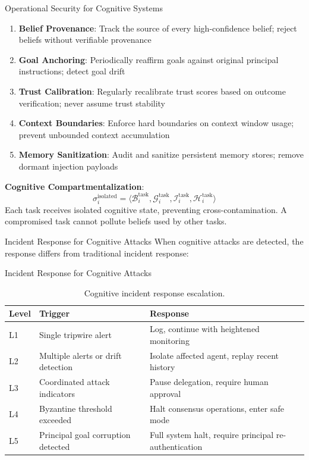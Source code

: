 \documentclass[
  ignorenonframetext,
]{beamer}
\begin{document}
\begin{frame}[allowframebreaks]{Operational Security for Cognitive
Systems}
\begin{enumerate}
\item \textbf{Belief Provenance}: Track the source of every high-confidence belief; reject beliefs without verifiable provenance
\item \textbf{Goal Anchoring}: Periodically reaffirm goals against original principal instructions; detect goal drift
\item \textbf{Trust Calibration}: Regularly recalibrate trust scores based on outcome verification; never assume trust stability
\item \textbf{Context Boundaries}: Enforce hard boundaries on context window usage; prevent unbounded context accumulation
\item \textbf{Memory Sanitization}: Audit and sanitize persistent memory stores; remove dormant injection payloads
\end{enumerate}

\textbf{Cognitive Compartmentalization}: \begin{equation}
\label{eq:compartmentalization}
\sigma_i^{\text{isolated}} = \langle \mathcal{B}_i^{\text{task}}, \mathcal{G}_i^{\text{task}}, \mathcal{I}_i^{\text{task}}, \mathcal{H}_i^{\text{task}} \rangle
\end{equation} Each task receives isolated cognitive state, preventing
cross-contamination. A compromised task cannot pollute beliefs used by
other tasks.
\end{frame}

\begin{frame}[allowframebreaks]{Incident Response for Cognitive Attacks}
\protect{}\label{incident-response-for-cognitive-attacks}
When cognitive attacks are detected, the response differs from
traditional incident response:

\end{frame}

\begin{frame}[allowframebreaks]{Incident Response for Cognitive Attacks}
\begin{table}[htbp]
\centering
\caption{Cognitive incident response escalation.}
\label{tab:response-escalation}
\begin{tabular}{@{}llp{5cm}@{}}
\toprule
Level & Trigger & Response \\
\midrule
L1 & Single tripwire alert & Log, continue with heightened monitoring \\
L2 & Multiple alerts or drift detection & Isolate affected agent, replay recent history \\
L3 & Coordinated attack indicators & Pause delegation, require human approval \\
L4 & Byzantine threshold exceeded & Halt consensus operations, enter safe mode \\
L5 & Principal goal corruption detected & Full system halt, require principal re-authentication \\
\bottomrule
\end{tabular}
\end{table}

\end{frame}
\end{document}
